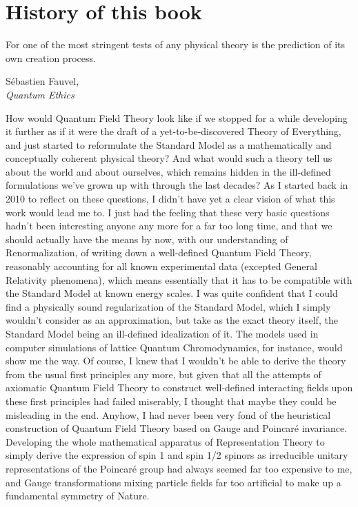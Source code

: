 \chapter*{History of this book}

\renewcommand{\epigraphwidth}{8.3cm}
\epigraph{For one of the most stringent tests of any physical theory is the prediction of its own creation process.}{Sébastien Fauvel,\\\textit{Quantum Ethics}~\cite{Fauvel2013}}

How would Quantum Field Theory look like if we stopped for a while developing it further as if it were the draft of a yet-to-be-discovered Theory of Everything, and just started to reformulate the Standard Model as a mathematically and conceptually coherent physical theory? And what would such a theory tell us about the world and about ourselves, which remains hidden in the ill-defined formulations we've grown up with through the last decades? As I started back in 2010 to reflect on these questions, I didn't have yet a clear vision of what this work would lead me to. I just had the feeling that these very basic questions hadn't been interesting anyone any more for a far too long time, and that we should actually have the means by now, with our understanding of Renormalization, of writing down a well-defined Quantum Field Theory, reasonably accounting for all known experimental data (excepted General Relativity phenomena), which means essentially that it has to be compatible with the Standard Model at known energy scales. I was quite confident that I could find a physically sound regularization of the Standard Model, which I simply wouldn't consider as an approximation, but take as the exact theory itself, the Standard Model being an ill-defined idealization of it. The models used in computer simulations of lattice Quantum Chromodynamics, for instance, would show me the way. Of course, I knew that I wouldn't be able to derive the theory from the usual first principles any more, but given that all the attempts of axiomatic Quantum Field Theory to construct well-defined interacting fields upon these first principles had failed miserably, I thought that maybe they could be misleading in the end. Anyhow, I had never been very fond of the heuristical construction of Quantum Field Theory based on Gauge and Poincaré invariance. Developing the whole mathematical apparatus of Representation Theory to simply derive the expression of spin 1 and spin 1/2 spinors as irreducible unitary representations of the Poincaré group had always seemed far too expensive to me, and Gauge transformations mixing particle fields far too artificial to make up a fundamental symmetry of Nature.

